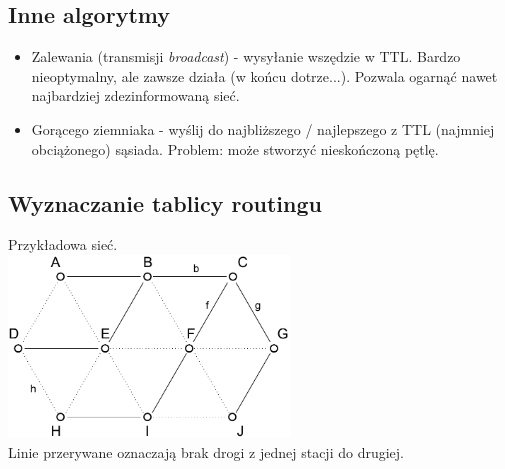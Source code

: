		\subsection{Inne algorytmy}
			\begin{itemize}
				\item Zalewania (transmisji \emph{broadcast}) - wysyłanie wszędzie w TTL. Bardzo nieoptymalny, ale zawsze działa (w końcu dotrze...). Pozwala ogarnąć nawet najbardziej zdezinformowaną sieć.
				\item Gorącego ziemniaka - wyślij do najbliższego / najlepszego z TTL (najmniej obciążonego) sąsiada. Problem: może stworzyć nieskończoną pętlę.
			\end{itemize}
		\subsection{Wyznaczanie tablicy routingu}
			Przykładowa sieć.\\
			\includegraphics[width=7.5cm]{./images/image38.pdf}\\
			Linie przerywane oznaczają brak drogi z jednej stacji do drugiej.
